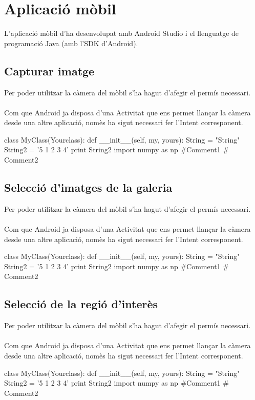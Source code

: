 \section{Aplicació mòbil}
	L'aplicació mòbil d'ha desenvolupat amb Android Studio i el llenguatge de programació Java (amb l'SDK d'Android).
	\subsection{Capturar imatge}
		Per poder utilitzar la càmera del mòbil s'ha hagut d'afegir el permís necessari.\\\\
		Com que Android ja disposa d'una Activitat que ens permet llançar la càmera desde una altre aplicació, nomès ha sigut necessari fer l'Intent corresponent.\\
		\begin{python}
class MyClass(Yourclass):
  def __init__(self, my, yours):
    String = "String"
    String2 = '5 1 2 3 4'
    print String2
import numpy as np #Comment1
  # Comment2
		\end{python}
	\subsection{Selecció d'imatges de la galeria}
		Per poder utilitzar la càmera del mòbil s'ha hagut d'afegir el permís necessari.\\\\
		Com que Android ja disposa d'una Activitat que ens permet llançar la càmera desde una altre aplicació, nomès ha sigut necessari fer l'Intent corresponent.\\
		\begin{python}
class MyClass(Yourclass):
  def __init__(self, my, yours):
    String = "String"
    String2 = '5 1 2 3 4'
    print String2
import numpy as np #Comment1
  # Comment2
		\end{python}
	\subsection{Selecció de la regió d'interès}
		Per poder utilitzar la càmera del mòbil s'ha hagut d'afegir el permís necessari.\\\\
		Com que Android ja disposa d'una Activitat que ens permet llançar la càmera desde una altre aplicació, nomès ha sigut necessari fer l'Intent corresponent.\\
		\begin{python}
class MyClass(Yourclass):
  def __init__(self, my, yours):
    String = "String"
    String2 = '5 1 2 3 4'
    print String2
import numpy as np #Comment1
  # Comment2
		\end{python}
